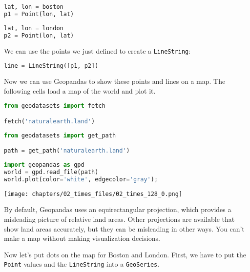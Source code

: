 \begin{lstlisting}[language=Python,style=source]
lat, lon = boston
p1 = Point(lon, lat)
\end{lstlisting}

\begin{lstlisting}[language=Python,style=source]
lat, lon = london
p2 = Point(lon, lat)
\end{lstlisting}

We can use the points we just defined to create a
\passthrough{\lstinline!LineString!}:

\begin{lstlisting}[language=Python,style=source]
line = LineString([p1, p2])
\end{lstlisting}

Now we can use Geopandas to show these points and lines on a map. The
following cells load a map of the world and plot it.

\begin{lstlisting}[language=Python,style=source]
from geodatasets import fetch

fetch('naturalearth.land')
\end{lstlisting}

\begin{lstlisting}[language=Python,style=source]
from geodatasets import get_path

path = get_path('naturalearth.land')
\end{lstlisting}

\begin{lstlisting}[language=Python,style=source]
import geopandas as gpd
world = gpd.read_file(path)
world.plot(color='white', edgecolor='gray');
\end{lstlisting}

\begin{center}
\texttt{[image: chapters/02\_times\_files/02\_times\_128\_0.png]}
\end{center}

By default, Geopandas uses an equirectangular projection, which provides
a misleading picture of relative land areas. Other projections are
available that show land areas accurately, but they can be misleading in
other ways. You can't make a map without making visualization decisions.

Now let's put dots on the map for Boston and London. First, we have to
put the \passthrough{\lstinline!Point!} values and the
\passthrough{\lstinline!LineString!} into a
\passthrough{\lstinline!GeoSeries!}.


